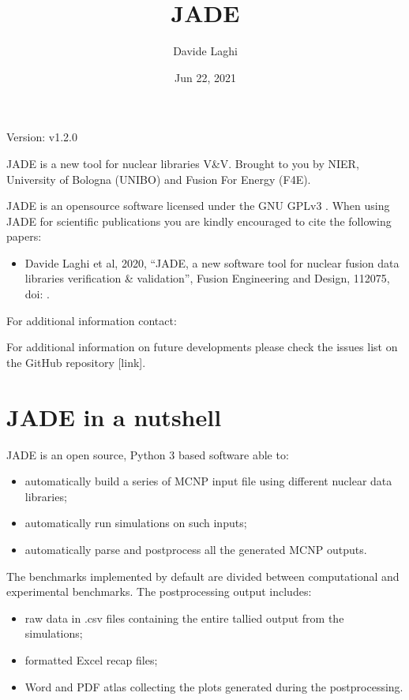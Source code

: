 \documentclass[letterpaper,10pt,english]{sphinxmanual}
\title{JADE}
\date{Jun 22, 2021}
\author{Davide Laghi}
\let\sphinxpxdimen\pdfpxdimen\else\newdimen\sphinxpxdimen
\begin{document}
\pagestyle{empty}
\sphinxmaketitle
\pagestyle{plain}
\sphinxtableofcontents
\pagestyle{normal}
\label{\detokenize{index::doc}}


Version: v1.2.0

JADE is a new tool for nuclear libraries V\&V.
Brought to you by NIER, University of Bologna (UNIBO) and Fusion For Energy (F4E).

JADE is an open\sphinxhyphen{}source software licensed under the GNU GPLv3 {\hyperref[\detokenize{LICENSE:license}]{}}.
When using JADE for scientific publications you are kindly encouraged to cite the following papers:
\begin{itemize}
\item {} 
Davide Laghi et al, 2020, “JADE, a new software tool for nuclear fusion data libraries verification \& validation”,
Fusion Engineering and Design,  112075, doi: .

\end{itemize}

For additional information contact: 

For additional information on future developments please check the issues list on the
GitHub repository {[}link{]}.


\chapter{JADE in a nutshell}
\label{\detokenize{nutshell:jade-in-a-nutshell}}\label{\detokenize{nutshell::doc}}
\noindent\sphinxincludegraphics[width=600\sphinxpxdimen]{{scheme}.png}

JADE is an open source, Python 3 based software able to:
\begin{itemize}
\item {} 
automatically build a series of MCNP input file using different nuclear
data libraries;

\item {} 
automatically run simulations on such inputs;

\item {} 
automatically parse and post\sphinxhyphen{}process all the generated MCNP outputs.

\end{itemize}

The benchmarks implemented by default are divided between computational
and experimental benchmarks. The post\sphinxhyphen{}processing output includes:
\begin{itemize}
\item {} 
raw data in .csv files containing the entire tallied output from the
simulations;

\item {} 
formatted Excel recap files;

\item {} 
Word and PDF atlas collecting the plots generated during the post\sphinxhyphen{}processing.

\end{itemize}
\end{document}
